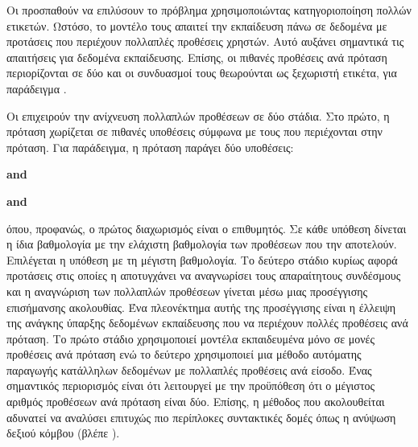 Οι \citet{xu2013exploiting} προσπαθούν να επιλύσουν το πρόβλημα χρησιμοποιώντας κατηγοριοποίηση πολλών ετικετών.
Ωστόσο, το μοντέλο τους απαιτεί την εκπαίδευση πάνω σε δεδομένα με προτάσεις που περιέχουν πολλαπλές προθέσεις χρηστών.
Αυτό αυξάνει σημαντικά τις απαιτήσεις για δεδομένα εκπαίδευσης.
Επίσης, οι πιθανές προθέσεις ανά πρόταση περιορίζονται σε δύο και οι συνδυασμοί τους θεωρούνται ως ξεχωριστή ετικέτα,
για παράδειγμα .

Οι \citet{kim2017two} επιχειρούν την ανίχνευση πολλαπλών προθέσεων σε δύο στάδια.
Στο πρώτο, η πρόταση χωρίζεται σε πιθανές υποθέσεις σύμφωνα με τους  που περιέχονται στην πρόταση.
Για παράδειγμα, η πρόταση  παράγει δύο υποθέσεις:
\begin{compactenum}
    \item {} \textbf{and} 
    \item {} \textbf{and} 
\end{compactenum}
όπου, προφανώς, ο πρώτος διαχωρισμός είναι ο επιθυμητός.
Σε κάθε υπόθεση δίνεται η ίδια βαθμολογία με την ελάχιστη βαθμολογία των προθέσεων που την αποτελούν.
Επιλέγεται η υπόθεση με τη μέγιστη βαθμολογία.
Το δεύτερο στάδιο κυρίως αφορά προτάσεις στις οποίες
η 
αποτυγχάνει να αναγνωρίσει τους απαραίτητους συνδέσμους και η αναγνώριση των πολλαπλών προθέσεων γίνεται μέσω μιας προσέγγισης επισήμανσης ακολουθίας.
Ένα πλεονέκτημα αυτής της προσέγγισης είναι η έλλειψη της ανάγκης ύπαρξης δεδομένων εκπαίδευσης που να περιέχουν πολλές προθέσεις ανά πρόταση.
Το πρώτο στάδιο χρησιμοποιεί μοντέλα εκπαιδευμένα μόνο σε μονές προθέσεις ανά πρόταση
ενώ το δεύτερο χρησιμοποιεί μια μέθοδο αυτόματης παραγωγής κατάλληλων δεδομένων με πολλαπλές προθέσεις ανά είσοδο.
Ένας σημαντικός περιορισμός είναι ότι λειτουργεί με την προϋπόθεση ότι ο μέγιστος αριθμός προθέσεων ανά πρόταση είναι δύο.
Επίσης, η μέθοδος που ακολουθείται αδυνατεί να αναλύσει επιτυχώς πιο περίπλοκες συντακτικές δομές όπως η ανύψωση δεξιού κόμβου (βλέπε ).

